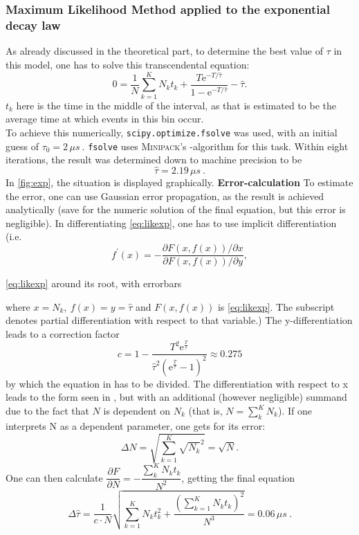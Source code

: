 \documentclass[english,  %
parskip=full,   %
headsepline]{scrartcl}
\newcommand{\mus}{\,\si{\mu s\:}}
\newcommand{\e}{\mathrm{e}}
\begin{document}
\subsubsection{Maximum Likelihood Method applied to the exponential decay law}\label{sec:evalexp}
As already discussed in the theoretical part, 
to determine the best value of $\tau$ in this model, one has to solve this transcendental equation:
\begin{equation}
    0 = \frac{1}{N}\sum_{k=1}^{K} N_kt_k + \frac{T\e^{-T/\hat{\tau}}}{1-\e^{-T/\hat{\tau}}} -\hat{\tau}. \label{eq:likexp}
\end{equation}
$t_k$ here is the time in the middle of the interval, as that is estimated to be the average time at which events in this bin occur.\\
To achieve this numerically, \verb+scipy.optimize.fsolve+ was used, with an initial guess of $\tau_0=2\mus$. \verb+fsolve+ uses \textsc{Minipack}'s -algorithm for this task. Within eight iterations, the result was determined down to machine precision to be 
\[
\hat{\tau}=2.19\mus.
\]
In \cref{fig:exp}, the situation is displayed graphically.
\textbf{Error-calculation}
To estimate the error, one can use Gaussian error propagation, as the result is achieved analytically (save for the numeric solution of the final equation, but this error is negligible). In differentiating \cref{eq:likexp}, one has to use implicit differentiation (i.e. \[f^\prime (x)=-\dfrac{{\partial F(x, f(x))}/{\partial x}}{{\partial F(x, f(x))}/{\partial y}},
\]\begin{floatingfigure}{0.6\linewidth}
 \centering
    
    \caption{\cref{eq:likexp} around its root, with errorbars}
    \label{fig:exp}
\end{floatingfigure} where $x=N_k,\: f(x)=y=\hat{\tau}$ and $F(x, f(x))$ is \cref{eq:likexp}. The subscript denotes partial differentiation with respect to that variable.) The y-differentiation leads to a correction factor
\[
c = 1-\dfrac{T^2\mathrm{e}^\frac{T}{\tau}}{\hat{\tau}^2\left(\mathrm{e}^\frac{T}{\hat{\tau}}-1\right)^2} \approx 0.275
\]
by which the equation in \cite{anleitung} has to be divided.  The differentiation with respect to x leads to the form seen in \cite{anleitung}, but with an additional (however negligible) summand due to the fact that $N$ is dependent on $N_k$ (that is, $N=\sum_k^KN_k$). If one interprets N as a dependent parameter, one gets for its error:
\[
\Delta N = \sqrt{\sum_{k=1}^K\sqrt{N_k}^2} = \sqrt{N}.
\]
One can then calculate $\dfrac{\partial F}{\partial N}=-\dfrac{\sum_k^KN_kt_k}{N^2}$, getting the final equation
\[\Delta\hat{\tau}=\frac{1}{c\cdot N}\sqrt{\sum_{k=1}^KN_kt_k^2+\dfrac{\left(\sum_{k=1}^KN_kt_k\right)^2}{N^3}}=0.06\mus.
\]
\clearpage
\end{document}
